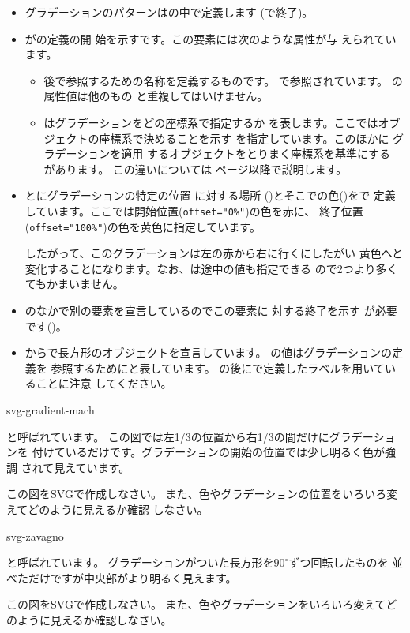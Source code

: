 \begin{itemize}
 \item グラデーションのパターンはの中で定義します
       (で終了)。
 \item {}がの定義の開
       始を示すです。この要素には次のような属性が与
       えられています。
\begin{itemize}
 \item {} 後で参照するための名称を定義するものです。
       で参照されています。 の属性値は他のもの
       と重複してはいけません。
 \item {} はグラデーションをどの座標系で指定するか
       を表します。ここではオブジェクトの座標系で決めることを示す
        を指定しています。このほかに
       グラデーションを適用
       するオブジェクトをとりまく座標系を基準にする
        があります。
この違いについては
       \pageref{diff-gradientUnits}ページ以降で説明します。
\end{itemize}
 \item {}とにグラデーションの特定の位置
       に対する場所
       ()とそこでの色()をで
       定義しています。ここでは開始位置(\texttt{offset="0\%"})の色を赤に、
       終了位置(\texttt{offset="100\%"})の色を黄色に指定しています。

       したがって、このグラデーションは左の赤から右に行くにしたがい
       黄色へと変化することになります。なお、は途中の値も指定できる
       ので2つより多くてもかまいません。
 \item {}のなかで別の要素を宣言しているのでこの要素に
       対する終了を示す が必要です()。
 \item {}からで長方形のオブジェクトを宣言しています。
         の値はグラデーションの定義を 
       参照するためにと表しています。
       \Showattrib{\#}の後にで定義したラベルを用いていることに注意
       してください。
\end{itemize}
{svg-gradient-mach}
{と呼ばれています。
この図では左1/3の位置から右1/3の間だけにグラデーションを
付けているだけです。グラデーションの開始の位置では少し明るく色が強調
されて見えています。
\par
この図をSVGで作成しなさい。
また、色やグラデーションの位置をいろいろ変えてどのように見えるか確認
しなさい。} 
%
{svg-zavagno}
{と呼ばれています。
グラデーションがついた長方形を$90^{\circ}$ずつ回転したものを
並べただけですが中央部がより明るく見えます。
\par
この図をSVGで作成しなさい。
また、色やグラデーションをいろいろ変えてどのように見えるか確認しなさい。}
